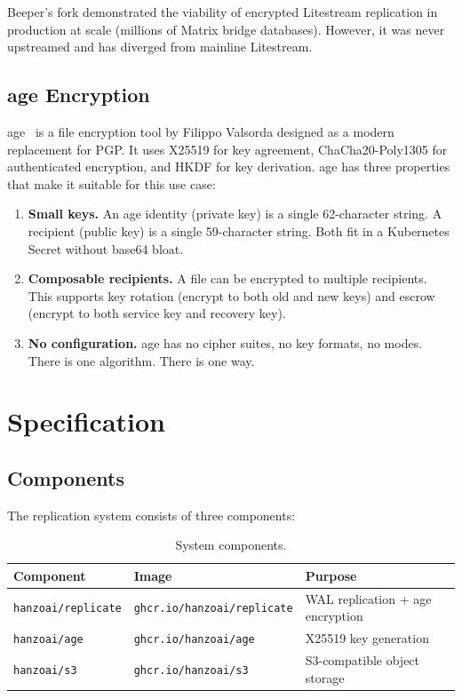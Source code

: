 \documentclass[11pt]{article}
\begin{document}
Beeper's fork demonstrated the viability of encrypted Litestream replication
in production at scale (millions of Matrix bridge databases). However, it
was never upstreamed and has diverged from mainline Litestream.

\subsection{age Encryption}

age~\cite{age} is a file encryption tool by Filippo Valsorda designed as a
modern replacement for PGP. It uses X25519 for key agreement, ChaCha20-Poly1305
for authenticated encryption, and HKDF for key derivation. age has three
properties that make it suitable for this use case:

\begin{enumerate}[nosep]
    \item \textbf{Small keys.} An age identity (private key) is a single
    62-character string. A recipient (public key) is a single 59-character
    string. Both fit in a Kubernetes Secret without base64 bloat.

    \item \textbf{Composable recipients.} A file can be encrypted to multiple
    recipients. This supports key rotation (encrypt to both old and new keys)
    and escrow (encrypt to both service key and recovery key).

    \item \textbf{No configuration.} age has no cipher suites, no key
    formats, no modes. There is one algorithm. There is one way.
\end{enumerate}

\section{Specification}

\subsection{Components}

The replication system consists of three components:

\begin{table}[H]
\centering
\begin{tabular}{@{}lll@{}}
\toprule
\textbf{Component} & \textbf{Image} & \textbf{Purpose} \\
\midrule
\texttt{hanzoai/replicate} & \texttt{ghcr.io/hanzoai/replicate} & WAL replication + age encryption \\
\texttt{hanzoai/age}       & \texttt{ghcr.io/hanzoai/age}       & X25519 key generation \\
\texttt{hanzoai/s3}        & \texttt{ghcr.io/hanzoai/s3}        & S3-compatible object storage \\
\bottomrule
\end{tabular}
\caption{System components.}
\label{tab:components}
\end{table}
\end{document}
